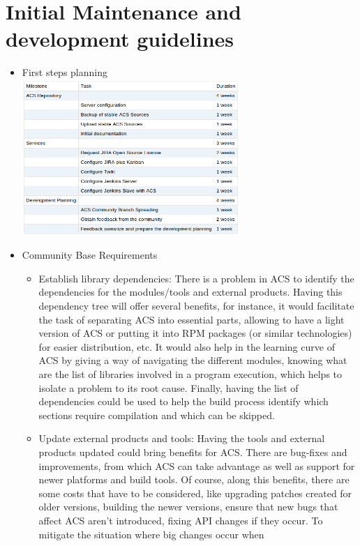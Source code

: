 \section{Initial Maintenance and development guidelines}
\begin{itemize}
	\item First steps planning \\
		\includegraphics[width=0.65\textwidth]{img/planning.png}	
	\item Community Base Requirements
	\begin{itemize}
		\item Establish library dependencies: There is a problem in ACS to identify the dependencies for the modules/tools and external products. 
			Having this dependency tree will offer several benefits, for instance, it would facilitate the task of separating ACS into essential 
			parts, allowing to have a light version of ACS or putting it into RPM packages (or similar technologies) for easier distribution, etc. 
			It would also help in the learning curve of ACS by giving a way of navigating the different modules, knowing what are the list of 
			libraries involved in a program execution, which helps to isolate a problem to its root cause. Finally, having the list of 
			dependencies could be used to help the build process identify which sections require compilation and which can be skipped.
		\item Update external products and tools: Having the tools and external products updated could bring benefits for ACS. There are bug-fixes and 
			improvements, from which ACS can take advantage as well as support for newer platforms and build tools. Of course, along this benefits, 
			there are some costs that have to be considered, like upgrading patches created for older versions, building the newer versions, ensure 
			that new bugs that affect ACS aren't introduced, fixing API changes if they occur. To mitigate the situation where big changes occur when 

\end{itemize}
\end{itemize}
